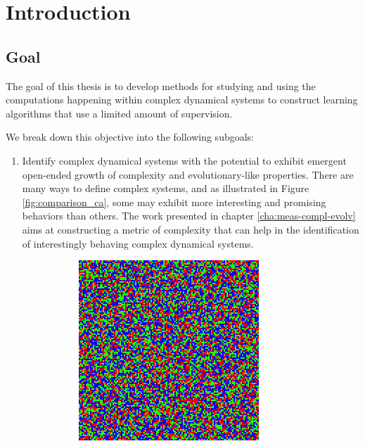 \chapter{Introduction}
\label{cha:introduction}

\section{Goal}

The goal of this thesis is to develop methods for studying and using the
computations happening within complex dynamical systems to construct learning
algorithms that use a limited amount of supervision.

We break down this objective into the following subgoals:

\begin{enumerate}
  \item Identify complex dynamical systems with the potential to exhibit
        emergent open-ended growth of complexity and evolutionary-like
        properties. There are many ways to define complex systems, and as
        illustrated in Figure \ref{fig:comparison_ca}, some may exhibit more
        interesting and promising behaviors than others. The work presented in
        chapter \ref{cha:meas-compl-evolv} aims at constructing a metric of
        complexity that can help in the identification of interestingly behaving
        complex dynamical systems.
\begin{figure}[htbp]
  \centering
\begin{subfigure}[b]{.4\linewidth}
  \centering
  \includegraphics[width=\linewidth]{figures/disord2.png}

\end{subfigure}
\end{figure}
\end{enumerate}
